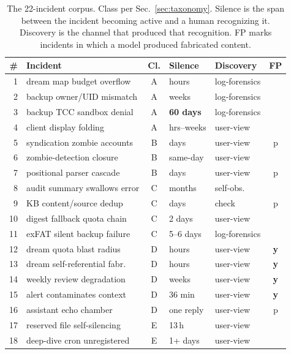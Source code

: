 \documentclass[conference]{IEEEtran}
\begin{document}
\begin{table}[t]
\caption{The 22-incident corpus. Class per Sec.~\ref{sec:taxonomy}. Silence
is the span between the incident becoming active and a human recognizing it.
Discovery is the channel that produced that recognition. FP marks incidents
in which a model produced fabricated content.}
\label{tab:corpus}
\centering
\footnotesize
\setlength{\tabcolsep}{3.2pt}
\renewcommand{\arraystretch}{1.08}
\begin{tabular}{@{}r l c l l c@{}}
\toprule
\# & Incident & Cl. & Silence & Discovery & FP \\
\midrule
1  & dream map budget overflow      & A & hours       & log-forensics & \\
2  & backup owner/UID mismatch      & A & weeks       & log-forensics & \\
3  & backup TCC sandbox denial      & A & \textbf{60 days} & log-forensics & \\
4  & client display folding         & A & hrs--weeks  & user-view & \\
5  & syndication zombie accounts    & B & days        & user-view & p \\
6  & zombie-detection closure       & B & same-day    & user-view & \\
7  & positional parser cascade      & B & days        & user-view & p \\
8  & audit summary swallows error   & C & months      & self-obs. & \\
9  & KB content/source dedup        & C & days        & check & p \\
10 & digest fallback quota chain    & C & 2 days      & user-view & \\
11 & exFAT silent backup failure    & C & 5--6 days   & log-forensics & \\
12 & dream quota blast radius       & D & hours       & user-view & \textbf{y} \\
13 & dream self-referential fabr.   & D & hours       & user-view & \textbf{y} \\
14 & weekly review degradation      & D & weeks       & user-view & \textbf{y} \\
15 & alert contaminates context     & D & 36 min      & user-view & \textbf{y} \\
16 & assistant echo chamber         & D & one reply   & user-view & p \\
17 & reserved file self-silencing   & E & 13\,h       & user-view & \\
18 & deep-dive cron unregistered    & E & 1+ days     & user-view & \\

\end{tabular}
\end{table}
\end{document}
